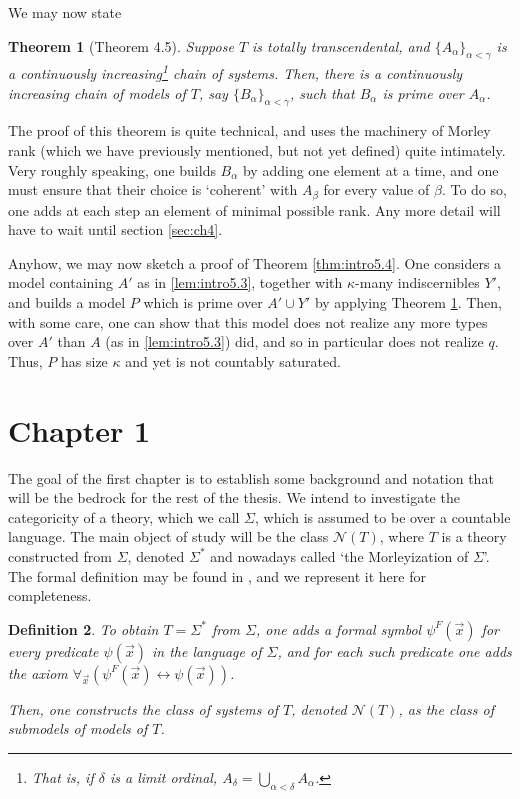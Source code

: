 \documentclass{article}
\newtheorem{theorem}{Theorem}[section]
\newtheorem{definition}[theorem]{Definition}
\theoremstyle{nonumberplain}
\newcommand{\calN}{\mathcal{N}}
\begin{document}
We may now state
\begin{theorem}[Theorem 4.5]\label{thm:intro4.5}
Suppose $T$ is totally transcendental, and $\{A_\alpha\}_{\alpha < \gamma}$ is a continuously increasing\footnote{That is, if $\delta$ is a limit ordinal, $A_\delta = \bigcup_{\alpha < \delta} A_\alpha$.} chain of systems. Then, there is a continuously increasing chain of models of $T$, say $\{B_\alpha\}_{\alpha < \gamma}$, such that $B_\alpha$ is prime over $A_\alpha$.
\end{theorem}

The proof of this theorem is quite technical, and uses the machinery of Morley rank (which we have previously mentioned, but not yet defined) quite intimately. Very roughly speaking, one builds $B_\alpha$ by adding one element at a time, and one must ensure that their choice is `coherent' with $A_\beta$ for every value of $\beta$. To do so, one adds at each step an element of minimal possible rank. Any more detail will have to wait until section \ref{sec:ch4}.

Anyhow, we may now sketch a proof of Theorem \ref{thm:intro5.4}. One considers a model containing $A'$ as in \ref{lem:intro5.3}, together with $\kappa$-many indiscernibles $Y'$, and builds a model $P$ which is prime over $A' \cup Y'$ by applying Theorem \ref{thm:intro4.5}. Then, with some care, one can show that this model does not realize any more types over $A'$ than $A$ (as in \ref{lem:intro5.3}) did, and so in particular does not realize $q$. Thus, $P$ has size $\kappa$ and yet is not countably saturated.

\section{Chapter 1}\label{sec:ch1}

The goal of the first chapter is to establish some background and notation that will be the bedrock for the rest of the thesis. We intend to investigate the categoricity of a theory, which we call $\Sigma$, which is assumed to be over a countable language. The main object of study will be the class $\calN(T)$, where $T$ is a theory constructed from $\Sigma$, denoted $\Sigma^*$ and nowadays called `the Morleyization of $\Sigma$'. The formal definition may be found in \cite{morley}, and we represent it here for completeness.

\begin{definition}
To obtain $T = \Sigma^*$ from $\Sigma$, one adds a formal symbol $\psi^F(\vec x)$ for every predicate $\psi(\vec x)$ in the language of $\Sigma$, and for each such predicate one adds the axiom $\forall_{\vec x} (\psi^F(\vec x) \leftrightarrow \psi(\vec x))$.

Then, one constructs the class of \emph{systems of $T$}, denoted $\calN(T)$, as the class of submodels of models of $T$.
\end{definition}
\end{document}

